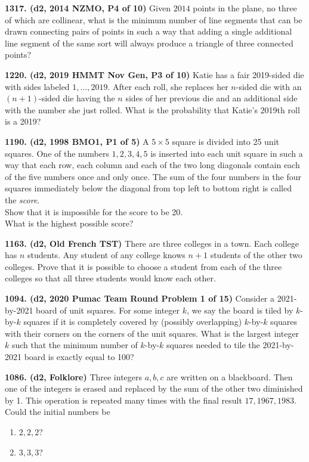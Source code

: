 \documentclass{article}
\begin{document}
        \textbf{1317. (\color{red}d2\color{black}, 2014 NZMO, P4 of 10)} Given \(2014\) points in the plane, no three of which are collinear, what is the minimum number of line segments that can be drawn connecting pairs of points in such a way that adding a single additional line segment of the same sort will always produce a triangle of three connected points?


        \textbf{1220. (\color{red}d2\color{black}, 2019 HMMT Nov Gen, P3 of 10)} Katie has a fair 2019-sided die with sides labeled $1, \ldots , 2019.$ After each roll, she replaces her $n$-sided die with an $(n+ 1)$-sided die having the $n$ sides of her previous die and an additional side with the number she just rolled. What is the probability that Katie's 2019th roll is a 2019?

        \textbf{1190. (\color{red}d2\color{black}, 1998 BMO1, P1 of 5)} A $5\times 5$ square is divided into 25 unit squares. One of the numbers $1, 2, 3, 4, 5$ is inserted into each unit square in such a way that each row, each column and each of the two long diagonals contain each of the five numbers once and only once. The sum of the four numbers in the four squares immediately below the diagonal from top left to bottom right is called the \emph{score}.\\Show that it is impossible for the score to be 20.\\What is the highest possible score?

        \textbf{1163. (\color{red}d2\color{black}, Old French TST)} There are three colleges in a town. Each college has $n$ students. Any student of any college knows $n+1$ students of the other two colleges. Prove that it is possible to choose a student from each of the three colleges so that all three students would know each other.

        \textbf{1094. (\color{red}d2\color{black}, 2020 Pumac Team Round Problem 1 of 15)} Consider a 2021-by-2021 board of unit squares. For some integer $k$, we say the board is tiled by $k$-by-$k$ squares if it is completely covered by (possibly overlapping) $k$-by-$k$ squares with their corners on the corners of the unit squares. What is the largest integer $k$ such that the minimum number of $k$-by-$k$ squares needed to tile the 2021-by-2021 board is exactly equal to 100?

        \textbf{1086. (\color{red}d2\color{black}, Folklore)} Three integers $a, b, c$ are written on a blackboard. Then one of the integers is erased and replaced by the sum of the other two diminished by 1. This operation is repeated many times with the final result $17,1967,1983$. Could the initial numbers be
        \begin{enumerate}
                \item $2,2,2$?
                \item $3,3,3$?
        \end{enumerate}
\end{document}
